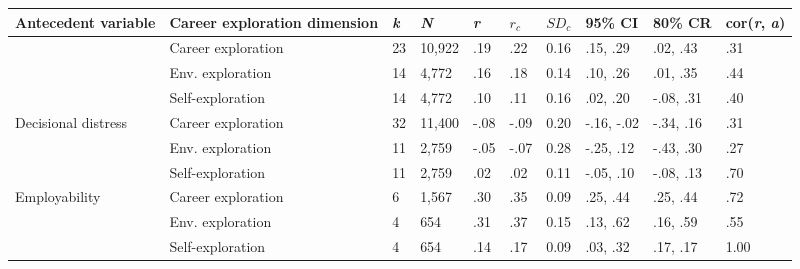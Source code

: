 \begin{table}[ht]
\centering
\begin{tabular}{llllllllll}
  \hline
Antecedent variable & Career exploration dimension & \textit{k} & \textit{N} & \textit{r} & \textit{$r_c$} & \textit{$SD_c$} & 95\% CI & 80\% CR & cor(\textit{r}, \textit{a})  \\ 
  \hline
{} & Career exploration & 23 & 10,922 & .19 & .22 & 0.16 & .15, .29 & .02, .43 & .31 \\ 
   & \hspace{0.8em}Env. exploration & 14 & 4,772 & .16 & .18 & 0.14 & .10, .26 & .01, .35 & .44 \\ 
   & \hspace{0.8em}Self-exploration & 14 & 4,772 & .10 & .11 & 0.16 & .02, .20 & -.08, .31 & .40 \\ 
  Decisional distress & Career exploration & 32 & 11,400 & -.08 & -.09 & 0.20 & -.16, -.02 & -.34, .16 & .31 \\ 
   & \hspace{0.8em}Env. exploration & 11 & 2,759 & -.05 & -.07 & 0.28 & -.25, .12 & -.43, .30 & .27 \\ 
   & \hspace{0.8em}Self-exploration & 11 & 2,759 & .02 & .02 & 0.11 & -.05, .10 & -.08, .13 & .70 \\ 
  Employability & Career exploration & 6 & 1,567 & .30 & .35 & 0.09 & .25, .44 & .25, .44 & .72 \\ 
   & \hspace{0.8em}Env. exploration & 4 & 654 & .31 & .37 & 0.15 & .13, .62 & .16, .59 & .55 \\ 
   & \hspace{0.8em}Self-exploration & 4 & 654 & .14 & .17 & 0.09 & .03, .32 & .17, .17 & 1.00 \\ 
   \hline
\end{tabular}
\end{table}
